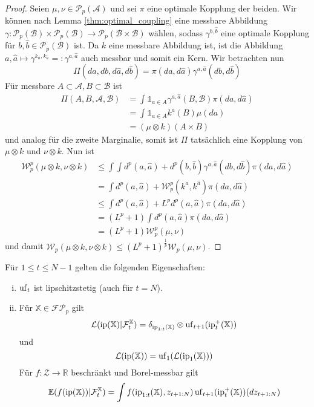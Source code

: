 \begin{proof}
    Seien $\mu, \nu \in \mathcal{P}_p(\mathcal{A})$ und sei $\pi$ eine optimale Kopplung der beiden. Wir können nach Lemma \ref{thm:optimal_coupling} eine messbare Abbildung $\gamma: \mathcal{P}_p(\mathcal{B})\times \mathcal{P}_p(\mathcal{B}) \rightarrow \mathcal{P}_p(\mathcal{B}\times \mathcal{B})$ wählen, sodass $\gamma^{b, \hat{b}}$ eine optimale Kopplung für $b,\hat{b} \in \mathcal{P}_p(\mathcal{B})$ ist. Da $k$ eine messbare Abbildung ist, ist die Abbildung $a,\hat{a} \mapsto \gamma^{k_a, k_{\hat{a}}}=:\gamma^{a,\hat{a}}$ auch messbar und somit ein Kern. Wir betrachten nun 
    $$\Pi(da, db, d\hat{a}, d\hat{b}) = \pi(da,d\hat{a}) \gamma^{a,\hat{a}}(db, d\hat{b})$$
    Für messbare $A\subset\mathcal{A}, B\subset \mathcal{B}$ ist 
    \begin{align*}
        \Pi(A, B, \mathcal{A}, \mathcal{B}) &= \int \mathds{1}_{a \in A} \gamma^{a,\hat{a}}(B, \mathcal{B}) \pi(da, d\hat{a}) \\
        &= \int \mathds{1}_{a \in A} k^a(B) \mu(da) \\
        &= (\mu \otimes k)(A\times B)
    \end{align*}
    und analog für die zweite Marginalie, somit ist $\Pi$ tatsächlich eine Kopplung von $\mu \otimes k$ und $\nu \otimes k$. Nun ist
    \begin{align*}
        \mathcal{W}_p^p(\mu \otimes k, \nu \otimes k) &\leq \int \int d^p(a, \hat{a}) + d^p(b, \hat{b}) \gamma^{a, \hat{a}}(db, d\hat{b}) \pi(da, d\hat{a}) \\
        &= \int d^p(a, \hat{a}) + \mathcal{W}_p^p(k^a, k^{\hat{a}})\pi(da, d\hat{a}) \\
        &\leq \int d^p(a, \hat{a}) + L^p d^p(a, \hat{a}) \pi(da, d\hat{a}) \\
        &= (L^p+1) \int d^p(a, \hat{a}) \pi(da, d\hat{a}) \\
        &= (L^p+1) \mathcal{W}_p^p(\mu, \nu)
    \end{align*}
    und damit $\mathcal{W}_p(\mu \otimes k, \nu \otimes k) \leq (L^p+1)^\frac{1}{p} \mathcal{W}_p(\mu, \nu)$.
\end{proof}
\begin{lemma}\label{thm:properties_unfold}
Für $1\leq t\leq N-1$ gelten die folgenden Eigenschaften:
\begin{enumerate}[(i)]
\item $\operatorname{uf}_t$ ist lipschitzstetig (auch für $t=N$).
\item Für $\mathbb{X}\in\mathcal{FP}_p$ gilt
\begin{align}
    \mathcal{L}(\operatorname{ip}(\mathbb{X})\vert \mathcal{F}_t^\mathbb{X})=\delta_{\operatorname{ip}_{1:t}(\mathbb{X})}\otimes \operatorname{uf}_{t+1}(\operatorname{ip}_t^+(\mathbb{X}))
\end{align}
und 
$$\mathcal{L}(\operatorname{ip}(\mathbb{X}))=\operatorname{uf}_1(\mathcal{L}(\operatorname{ip}_1(\mathbb{X})))$$
Für $f:\mathcal{Z}\rightarrow \mathbb{R}$ beschränkt und Borel-messbar gilt
\begin{align}\label{eq:uf_expected_value}
    \mathbb{E}(f(\operatorname{ip}(\mathbb{X}))\vert \mathcal{F}_t^\mathbb{X}) = \int f(\operatorname{ip}_{1:t}(\mathbb{X}), z_{t+1:N}) \operatorname{uf}_{t+1}(\operatorname{ip}_{t}^+(\mathbb{X}))(dz_{t+1:N})
\end{align}
\end{enumerate}
\end{lemma}
